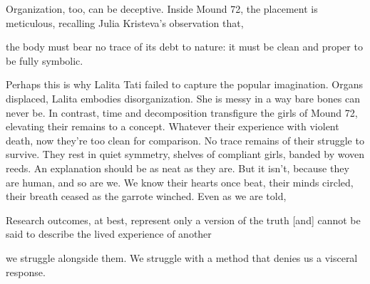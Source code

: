 Organization, too, can be deceptive. Inside Mound 72, the placement is meticulous, recalling Julia Kristeva's observation that, \begin{IJSRAquote}{\cite[102]{kristeva1982}}the body must bear no trace of its debt to nature: it must be clean and proper to be fully symbolic.\end{IJSRAquote} Perhaps this is why Lalita Tati failed to capture the popular imagination. Organs displaced, Lalita embodies disorganization. She is messy in a way bare bones can never be. In contrast, time and decomposition transfigure the girls of Mound 72, elevating their remains to a concept. Whatever their experience with violent death, now they're too clean for comparison. No trace remains of their struggle to survive. They rest in quiet symmetry, shelves of compliant girls, banded by woven reeds. An explanation should be as neat as they are. But it isn't, because they are human, and so are we. We know their hearts once beat, their minds circled, their breath ceased as the garrote winched. Even as we are told, \begin{IJSRAquote}{\cite[1153]{hewitt2007}}Research outcomes, at best, represent only a version of the truth [and] cannot be said to describe the lived experience of another\end{IJSRAquote} we struggle alongside them. We struggle with a method that denies us a visceral response. 

\nocite{ubelaker1992,thompson2015,pauketat1997,fowler1977,emerson2016}
\printbibliography[
title={For further reading},
keyword={furtherreading},
heading=subbibliography]
\printbibliography[
title={References},
notkeyword =furtherreading,
heading=subbibliography]

\IJSRAclosing%